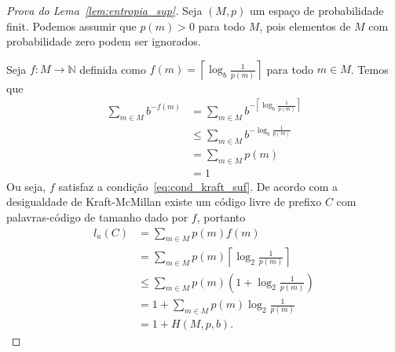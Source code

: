  \begin{proof}[Prova do Lema~\ref{lem:entropia_sup}]
    Seja $(M,p)$ um espaço de probabilidade finit. Podemos assumir que
    $p(m)>0$ para todo $M$, pois elementos de $M$ com probabilidade
    zero podem ser ignorados.

    Seja $f:M\to\mathbb{N}$ definida como $f(m) = \left \lceil{\log_b
      \frac{1}{p(m)} }\right \rceil$ para todo $m\in M$. Temos que
\begin{align*}
  \sum_{m \in M}^{} b^{-f(m)} &=
  \sum_{m \in M}^{} b^{-\left \lceil{\log_b \frac{1}{p(m)} }\right \rceil} \\
  &\leq \sum_{m \in M}^{} b^{-{\log_b \frac{1}{p(m)} }} \\
  &= \sum_{m \in M}^{} p(m) \\
  &= 1
\end{align*}
Ou seja, $f$ satisfaz a condição~\eqref{eq:cond_kraft_suf}. De acordo
com a desigualdade de Kraft-McMillan existe um código livre de prefixo
$C$ com palavras-código de tamanho dado por $f$, portanto
\begin{align*}
  l_a(C) &=
  \sum_{m \in M} p(m) f(m) \\
  &=  \sum_{m \in M} p(m) \left \lceil{\log_2 \frac{1}{p(m)} }\right \rceil \\
&\leq \sum_{m \in M}^{}p(m) \left(1 + \log_2 \frac{1}{p(m)}\right) \\
&= 1 +  \sum_{m \in M}^{}p(m) \log_2 \frac{1}{p(m)} \\
&= 1 + H(M,p,b).
\end{align*}
\end{proof}






